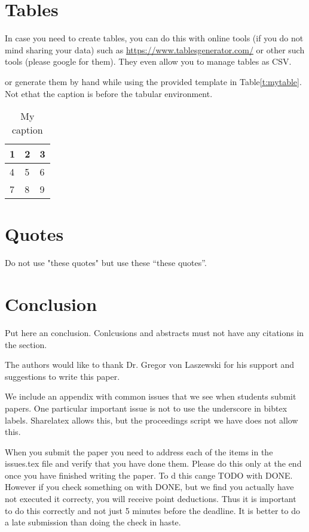 \section{Tables}

In case you need to create tables, you can do this with online tools
(if you do not mind sharing your data) such as
\url{https://www.tablesgenerator.com/} or other such tools (please
google for them). They even allow you to manage tables as CSV.

or generate them by hand while using the provided template in Table\ref{t:mytable}. Not ethat
the caption is before the tabular environment.

\begin{table}[htb]
\centering
\caption{My caption}
\label{t:mytabble}
\begin{tabular}{lll}
1 & 2 & 3 \\
\hline
4 & 5 & 6 \\
7 & 8 & 9
\end{tabular}
\end{table}

\section{Quotes}

Do not use "these quotes" but use these ``these quotes''. 


\section{Conclusion}

Put here an conclusion. Conlcusions and abstracts must not have any
citations in the section.


\begin{acks}

  The authors would like to thank Dr. Gregor von Laszewski for his
  support and suggestions to write this paper.

\end{acks}


 

\appendix

We include an appendix with common issues that we see when students
submit papers. One particular important issue is not to use the
underscore in bibtex labels. Sharelatex allows this, but the
proceedings script we have does not allow this.

When you submit the paper you need to address each of the items in the
issues.tex file and verify that you have done them. Please do this
only at the end once you have finished writing the paper. To d this
cange TODO with DONE. However if you check something on with DONE, but
we find you actually have not executed it correcty, you will receive
point deductions. Thus it is important to do this correctly and not
just 5 minutes before the deadline. It is better to do a late
submission than doing the check in haste. 



